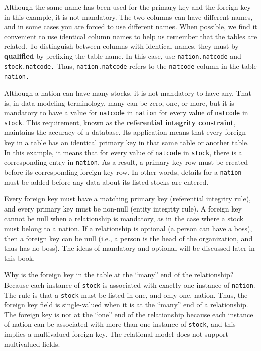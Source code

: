 \documentclass[
]{article}
\begin{document}
Although the same name has been used for the primary key and the foreign
key in this example, it is not mandatory. The two columns can have
different names, and in some cases you are forced to use different
names. When possible, we find it convenient to use identical column
names to help us remember that the tables are related. To distinguish
between columns with identical names, they must by \textbf{qualified} by
prefixing the table name. In this case, use \texttt{nation.natcode} and
\texttt{stock.natcode.} Thus, \texttt{nation.natcode} refers to the \texttt{natcode} column
in the table \texttt{nation.}

Although a nation can have many stocks, it is not mandatory to have any.
That is, in data modeling terminology, many can be zero, one, or more,
but it is mandatory to have a value for \texttt{natcode} in \texttt{nation} for every
value of \texttt{natcode} in \texttt{stock}. This requirement, known as the
\textbf{referential integrity constraint}, maintains the accuracy of a
database. Its application means that every foreign key in a table has an
identical primary key in that same table or another table. In this
example, it means that for every value of \texttt{natcode} in \texttt{stock}, there is
a corresponding entry in \texttt{nation}. As a result, a primary key row must
be created before its corresponding foreign key row. In other words,
details for a \texttt{nation} must be added before any data about its listed
stocks are entered.

Every foreign key must have a matching primary key (referential
integrity rule), and every primary key must be non-null (entity
integrity rule). A foreign key cannot be null when a relationship is
mandatory, as in the case where a stock must belong to a nation. If a
relationship is optional (a person can have a boss), then a foreign key
can be null (i.e., a person is the head of the organization, and thus
has no boss). The ideas of mandatory and optional will be discussed
later in this book.

Why is the foreign key in the table at the ``many'' end of the
relationship? Because each instance of \texttt{stock} is associated with
exactly one instance of \texttt{nation}. The rule is that a \texttt{stock} must be
listed in one, and only one, nation. Thus, the foreign key field is
single-valued when it is at the ``many'' end of a relationship. The
foreign key is not at the ``one'' end of the relationship because each
instance of nation can be associated with more than one instance of
\texttt{stock}, and this implies a multivalued foreign key. The relational
model does not support multivalued fields.
\end{document}
